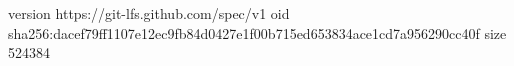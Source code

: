 version https://git-lfs.github.com/spec/v1
oid sha256:dacef79ff1107e12ec9fb84d0427e1f00b715ed653834ace1cd7a956290cc40f
size 524384

